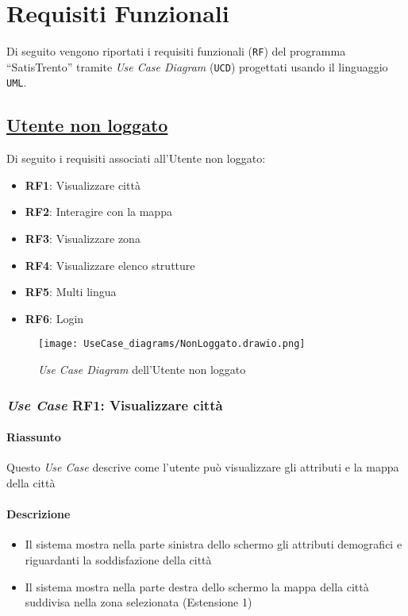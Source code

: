 \chapter{Requisiti Funzionali}
\label{ch:requisitiFunzionali}

Di seguito vengono riportati i requisiti funzionali (\texttt{RF}) del programma ``SatisTrento'' tramite \textit{Use Case Diagram} (\texttt{UCD}) progettati usando il linguaggio \texttt{UML}.

\section{\underline{Utente non loggato}}
    Di seguito i requisiti associati all'Utente non loggato:
    \begin{itemize}
        \item \textbf{RF1}: Visualizzare città
        \item \textbf{RF2}: Interagire con la mappa
        \item \textbf{RF3}: Visualizzare zona
        \item \textbf{RF4}: Visualizzare elenco strutture
        \item \textbf{RF5}: Multi lingua
        \item \textbf{RF6}: Login
    \end{itemize}
    \begin{figure}[H]
        \centering
        \texttt{[image: UseCase\_diagrams/NonLoggato.drawio.png]}
        \caption{\textit{Use Case Diagram} dell'Utente non loggato}
    \end{figure}

    \subsection{\textit{Use Case} RF1: Visualizzare città}
        \subsubsection{Riassunto}
            Questo \textit{Use Case} descrive come l'utente può visualizzare gli attributi e la mappa della città
        \subsubsection{Descrizione}
            \begin{itemize}
                \item Il sistema mostra nella parte sinistra dello schermo gli attributi demografici e riguardanti la soddisfazione della città
                \item Il sistema mostra nella parte destra dello schermo la mappa della città suddivisa nella zona selezionata (Estensione 1)
            \end{itemize}
